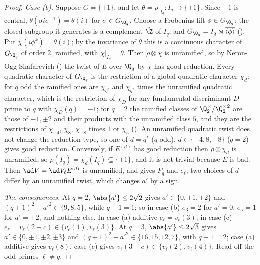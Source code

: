 \begin{proof}
\emph{Case (b).} Suppose $G=\{\pm1\}$, and let $\theta=\rho|_{I_q}\colon I_q\to\{\pm1\}$. Since $-1$ is central, $\theta(\sigma i\sigma^{-1})=\theta(i)$ for $\sigma\in G_{\Q_q}$. Choose a Frobenius lift
$\phi\in G_{\Q_q}$; the closed subgroup it generates is a complement $\hat\Z$ of $I_q$, and $G_{\Q_q}=I_q\rtimes\overline{\langle\phi\rangle}$ (). Put $\chi(i\phi^k)=\theta(i)$; by the
invariance of $\theta$ this is a continuous character of $G_{\Q_q}$ of order $2$, ramified, with $\chi|_{I_q}=\theta$. Then $\rho\otimes\chi$ is unramified, so by Neron-Ogg-Shafarevich
() the twist of $E$ over $\Q_q$ by $\chi$ has good reduction. Every quadratic character of $G_{\Q_q}$ is the restriction of a global quadratic character
$\chi_d$: for $q$ odd the ramified ones are $\chi_{q^*}$ and $\chi_{q^*}$ times the unramified quadratic character, which is the restriction of $\chi_D$ for any fundamental discriminant $D$ prime to $q$
with $\chi_D(q)=-1$; for $q=2$ the ramified classes of $\Q_2^\times/\Q_2^{\times2}$ are
those of $-1,\pm2$ and their products with the unramified class $5$, and they are the restrictions of $\chi_{-4}$, $\chi_8$, $\chi_{-8}$ times $1$ or $\chi_5$ (). An
unramified quadratic twist does not change the reduction type, so one of $d=q^*$ ($q$ odd), $d\in\{-4,8,-8\}$ ($q=2$) gives good reduction. Conversely, if $E^{(d)}$ has good
reduction then $\rho\otimes\chi_d$ is unramified, so $\rho(I_q)=\chi_d(I_q)\subseteq\{\pm1\}$, and it is not trivial because $E$ is bad. Then $\ad V=\ad V_\ell E^{(d)}$ is unramified, and
 gives $P_q$ and $e_\ell$; two choices of $d$ differ by an unramified twist, which changes $a'$ by a sign.

\emph{The consequences.} At $q=2$, $\abs{a'}\le2\sqrt2$ gives $a'\in\{0,\pm1,\pm2\}$ and $(q+1)^2-a'^2\in\{9,8,5\}$, while $q-1=1$; so in case (b) $e_3=2$ for $a'=0$, $e_5=1$ for $a'=\pm2$, and
nothing else. In case (a) additive $e_\ell=v_\ell(3)$; in case (c) $e_\ell=v_\ell(2-c)\in\{v_\ell(1),v_\ell(3)\}$. At $q=3$, $\abs{a'}\le2\sqrt3$ gives $a'\in\{0,\pm1,\pm2,\pm3\}$ and
$(q+1)^2-a'^2\in\{16,15,12,7\}$, with $q-1=2$; case (a) additive gives $v_\ell(8)$, case (c) gives $v_\ell(3-c)\in\{v_\ell(2),v_\ell(4)\}$. Read off the odd primes $\ell\ne q$.
\end{proof}

